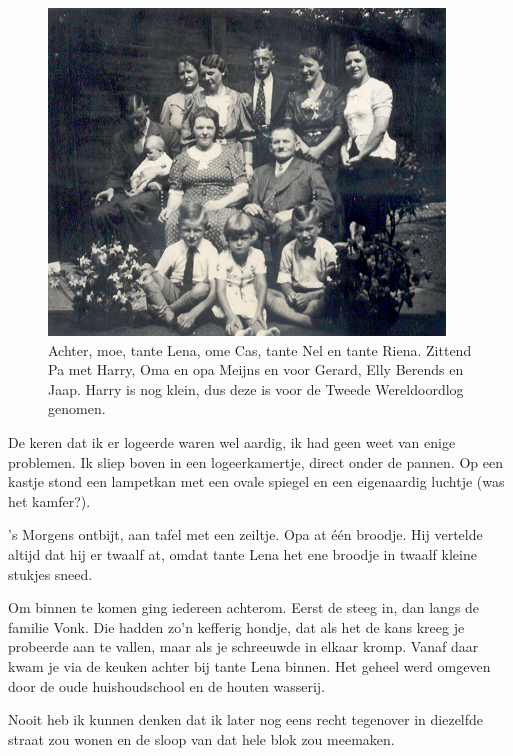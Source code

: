 \documentclass[10pt,twoside, openright]{memoir}
\begin{document}
\begin{figure}[t]
\includegraphics[width=\textwidth]{img/ch1/famMeijns2}
\caption*{\footnotesize Achter, moe, tante Lena, ome Cas, tante Nel en tante Riena. Zittend Pa met Harry, Oma en opa Meijns en voor Gerard, Elly Berends en Jaap. Harry is nog klein, dus deze is voor de Tweede Wereldoordlog genomen.}
\end{figure}

De keren dat ik er logeerde waren wel aardig, ik had geen weet van enige problemen. Ik sliep boven in een logeerkamertje, direct onder de pannen. Op een kastje stond een lampetkan met een ovale spiegel en een eigenaardig luchtje (was het kamfer?). 

’s Morgens ontbijt, aan tafel met een zeiltje. Opa at één broodje. Hij vertelde altijd dat hij er twaalf at, omdat tante Lena het ene broodje in twaalf kleine stukjes sneed. 

Om binnen te komen ging iedereen achterom. Eerst de steeg in, dan langs de familie Vonk. Die hadden zo’n kefferig hondje, dat als het de kans kreeg je probeerde aan te vallen, maar als je schreeuwde in elkaar kromp. Vanaf daar kwam je via de keuken achter bij tante Lena binnen. Het geheel werd omgeven door de oude huishoudschool en de houten wasserij.  

Nooit heb ik kunnen denken dat ik later nog eens recht tegenover in diezelfde straat zou wonen en de sloop van dat hele blok zou meemaken.
\end{document}

